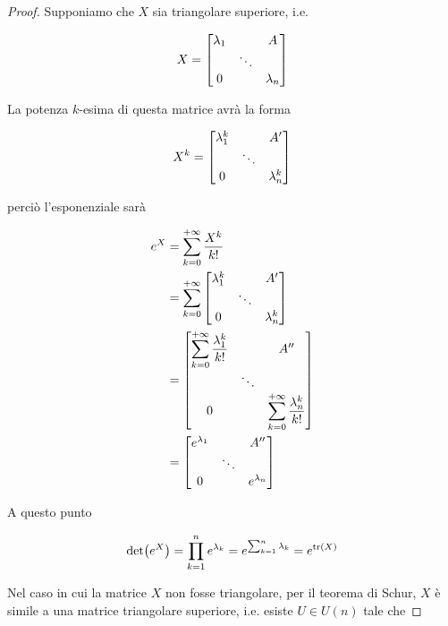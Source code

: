 \begin{proof}
	Supponiamo che $ X $ sia triangolare superiore, i.e.
	
	\begin{equation}
		X = %
		\bmqty{ %
				\lambda_{1} & & A \\
				& \ddots & \\
				0 & & \lambda_{n} %
				}
	\end{equation}

	La potenza $ k $-esima di questa matrice avrà la forma
	
	\begin{equation}
		X^{k} = %
		\bmqty{ %
				\lambda_{1}^{k} & & A' \\
				& \ddots & \\
				0 & & \lambda_{n}^{k} %
				}
	\end{equation}

	perciò l'esponenziale sarà
	
	\begin{align}
		\begin{split}
			e^{X} &= \sum_{k=0}^{+\infty} \dfrac{X^{k}}{k!} \\
			&= \sum_{k=0}^{+\infty} %
				\bmqty{ %
						\lambda_{1}^{k} & & A' \\
						& \ddots & \\
						0 & & \lambda_{n}^{k} %
						} \\
			&= \bmqty{ %
						\displaystyle\sum_{k=0}^{+\infty} \dfrac{\lambda_{1}^{k}}{k!} & & A'' \\
						& \ddots & \\
						0 & & \displaystyle\sum_{k=0}^{+\infty} \dfrac{\lambda_{n}^{k}}{k!} %
						} \\
			&= \bmqty{ %
						e^{\lambda_{1}} & & A'' \\
						& \ddots & \\
						0 & & e^{\lambda_{n}} %
						}
		\end{split}
	\end{align}

	A questo punto
	
	\begin{equation}
		\det(e^{X}) = \prod_{k=1}^{n} e^{\lambda_{k}} %
		= e^{\sum_{k=1}^{n} \lambda_{k}} %
		= e^{\tr(X)}
	\end{equation}

	Nel caso in cui la matrice $ X $ non fosse triangolare, per il teorema di Schur, $ X $ è simile a una matrice triangolare superiore, i.e. esiste $ U \in U(n) $ tale che
	

\end{proof}
